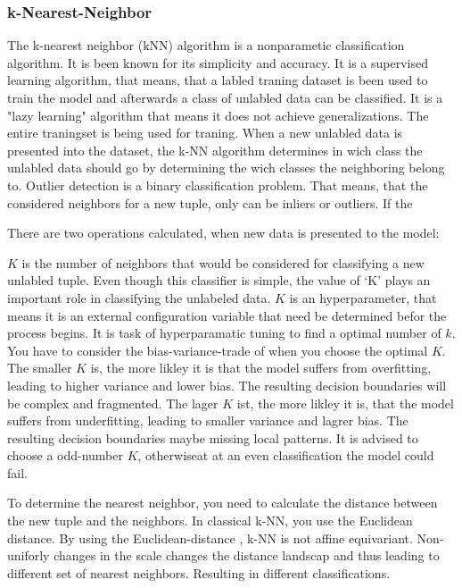 \subsubsection*{k-Nearest-Neighbor}
The k-nearest neighbor (kNN) algorithm is a nonparametic classification algorithm. It is been known for its simplicity and accuracy.
It is a supervised learning algorithm, that means, that a labled traning dataset is been used to train the model and afterwards a class of unlabled data can be classified.
It is a "lazy learning" algorithm that means it does not achieve generalizations. The entire traningset is being used for traning.
When a new unlabled data is presented into the dataset, the k-NN algorithm determines in wich class the unlabled data should go by determining the wich classes the neighboring belong to.
Outlier detection is a binary classification problem. That means, that the considered neighbors for a new tuple, only can be inliers or outliers. 
If the 


There are two operations calculated, when new data is presented to the model:
\citep[p.1256 pp.]{9065747}


$K$ is the number of neighbors that would be considered for classifying a new unlabled tuple. 
Even though this classifier is simple, the value of ‘K’ plays an important role in classifying the unlabeled data.
$K$ is an hyperparameter, that means it is an external configuration variable that need be determined befor the process begins.
It is task of hyperparamatic tuning to find a optimal number of $k$. 
You have to consider the bias-variance-trade of when you choose the optimal $K$. 
The smaller $K$ is, the more likley it is that the model suffers from overfitting, leading to higher variance and lower bias.
The resulting decision boundaries will be complex and fragmented.
The lager $K$ ist, the more likley it is, that the model suffers from underfitting, leading to smaller variance and lagrer bias.
The resulting decision boundaries maybe missing local patterns.
It is advised to choose a odd-number $K$, otherwiseat at an even classification the model could fail.  


To determine the nearest neighbor, you need to calculate the distance between the new tuple and the neighbors. 
In classical k-NN, you use the Euclidean distance. 
By using the Euclidean-distance , k-NN is not affine equivariant.
Non-uniforly changes in the scale changes the distance landscap and thus leading to different set of nearest neighbors.
Resulting in different classifications. 


